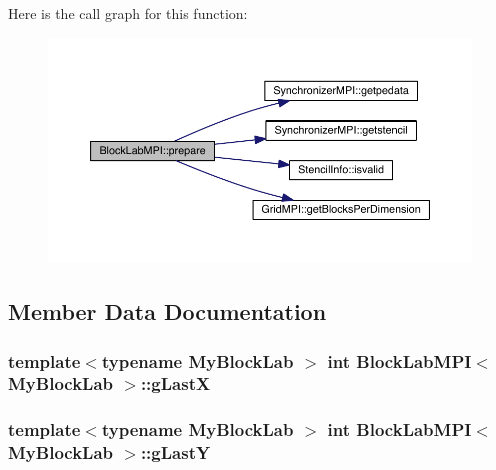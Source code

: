 Here is the call graph for this function\+:\nopagebreak
\begin{figure}[H]
\begin{center}
\leavevmode
\includegraphics[width=350pt]{d9/dee/class_block_lab_m_p_i_a49e9b846d16c1c3f177b6ff067bc791c_cgraph}
\end{center}
\end{figure}




\subsection{Member Data Documentation}
\hypertarget{class_block_lab_m_p_i_a41646b94f197315e4c39c5155ee939eb}{}
\subsubsection[{g\+Last\+X}]{\setlength{\rightskip}{0pt plus 5cm}template$<$typename My\+Block\+Lab $>$ int {\bf Block\+Lab\+M\+P\+I}$<$ My\+Block\+Lab $>$\+::g\+Last\+X\hspace{0.3cm}{\ttfamily [protected]}}\label{class_block_lab_m_p_i_a41646b94f197315e4c39c5155ee939eb}
\hypertarget{class_block_lab_m_p_i_afc336a0d08b78a9196eb24701816d6c8}{}
\subsubsection[{g\+Last\+Y}]{\setlength{\rightskip}{0pt plus 5cm}template$<$typename My\+Block\+Lab $>$ int {\bf Block\+Lab\+M\+P\+I}$<$ My\+Block\+Lab $>$\+::g\+Last\+Y\hspace{0.3cm}{\ttfamily [protected]}}\label{class_block_lab_m_p_i_afc336a0d08b78a9196eb24701816d6c8}
\hypertarget{class_block_lab_m_p_i_a8b9247a3ec2caad18896f597b98b7103}{}
